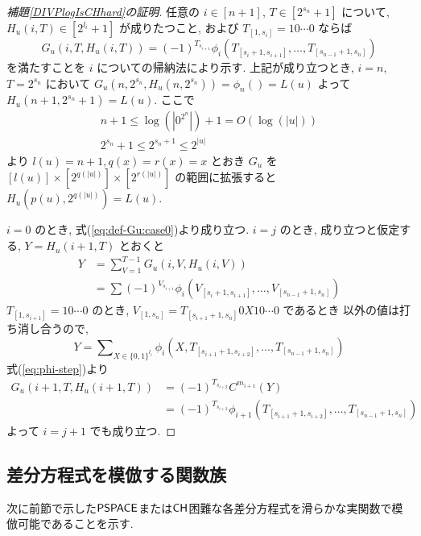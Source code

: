 \begin{proof}[\textup{補題\ref{DIVPlogIsCHhard}の証明}]
 任意の $i \in [n+1]$, $T \in [2^{s_n}+1]$ について,
 $H_u(i,T) \in [2^{l_i}+1]$ が成りたつこと,
 および $T_{[1,s_i]} = 10 \cdots 0$ ならば
 \begin{equation} \label{eq:subformula}
  G_u(i,T,H_u(i,T)) = (-1)^{T_{s_{i+1}}} 
   \phi_i(T_{[s_i+1, s_{i+1}]}, \dots, T_{[s_{n-1}+1, s_n]})
 \end{equation}
 を満たすことを $i$ についての帰納法により示す.
 上記が成り立つとき,
 $i=n$, $T=2^{s_n}$ において $G_u(n, 2^{s_n}, H_u(n,2^{s_n})) = \phi_n() = L(u)$
 よって $H_u(n+1, 2^{s_n}+1) = L(u)$.
 ここで 
 \begin{gather}
  n+1 \le \log(|0^{2^n}|) + 1 = O(\log(|u|)) \\
  2^{s_n}+1 \le 2^{s_n+1} \le 2^{|u|}
 \end{gather}
 より $l(u) = n+1, q(x) = r(x) = x$ とおき $G_u$ を
 $[l(u)] \times [2^{q(|u|)}] \times [2^{r(|u|)}]$ の範囲に拡張すると
 $H_u(p(u), 2^{q(|u|)}) = L(u)$.

 $i=0$ のとき, 式(\ref{eq:def-Gu:case0})より成り立つ.
 $i=j$ のとき, 成り立つと仮定する, $Y = H_u(i+1, T)$ とおくと
 \begin{align}
  Y 
  &= \sum_{V = 1}^{T-1} G_u(i, V, H_u(i, V)) \\
  &= \sum (-1)^{V_{s_{i+1}}} \phi_i(V_{[s_i+1, s_{i+1}]}, 
   \dots, V_{[s_{n-1}+1, s_n]})
 \end{align}
 $T_{[1, s_{i+1}]} = 10 \cdots 0$ のとき,
 $V_{[1, s_n]} = T_{[s_{i+1}+1,s_n]} 0 X 1 0 \cdots 0$ であるとき
 以外の値は打ち消し合うので,
 \begin{equation}
  Y = \sum\nolimits_{X \in \{0,1\}^{l_i}} 
  \phi_i(X, T_{[s_{i+1}+1, s_{i+2}]}, \dots, T_{[s_{n-1}+1, s_n]})
 \end{equation}
 式(\ref{eq:phi-step})より
 \begin{align}
  G_u(i+1,T,H_u(i+1,T)) 
  &= (-1)^{T_{s_{i+2}}} C^{m_{i+1}} (Y)\\
  &= (-1)^{T_{s_{i+2}}} \phi_{i+1}(T_{[s_{i+1}+1, s_{i+2}]}, \dots, T_{[s_{n-1}+1, s_n]})
 \end{align}
 よって $i=j+1$ でも成り立つ.
 \end{proof}



\subsection{差分方程式を模倣する関数族}
\label{subsection: ode family}
次に前節で示した$\mathsf{PSPACE}$または$\mathsf{CH}$困難な各差分方程式を滑らかな実関数で模倣可能であることを示す.

